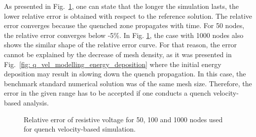 As presented in Fig.~\ref{fig: q_vel_modelling_res_volt_rel_error}, one can state that the longer the simulation lasts, the lower relative error is obtained with respect to the reference solution. The relative error converges because the quenched zone propagates with time. For 50 nodes, the relative error converges below -5\%.
In Fig. \ref{fig: q_vel_modelling_res_volt_rel_error}, the case with 1000 nodes also shows the similar shape of the relative error curve. For that reason, the error cannot be explained by the decrease of mesh density, as it was presented in Fig.~\ref{fig: q_vel_modelling_energy_deposition} where the initial energy deposition may result in slowing down the quench propagation. In this case, the benchmark standard numerical solution was of the same mesh size. Therefore, the error in the given range has to be accepted if one conducts a quench velocity-based analysis.

\begin{figure}[H]
\centering
    \caption{Relative error of resistive voltage for 50, 100 and 1000 nodes used for quench velocity-based simulation.}
    \label{fig: q_vel_modelling_res_volt_rel_error}
\end{figure}

